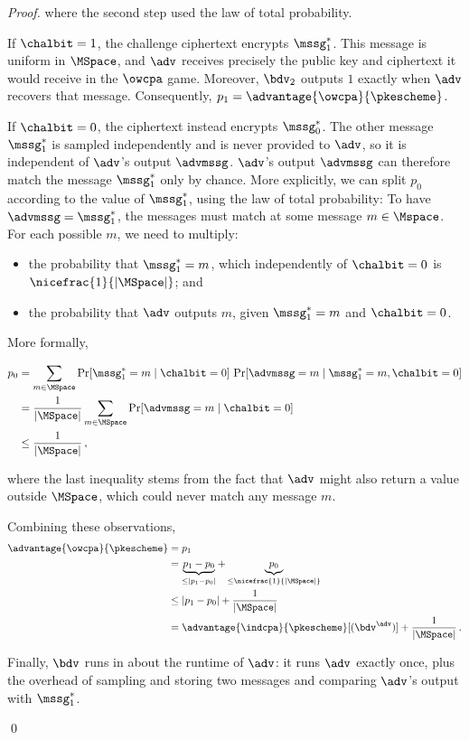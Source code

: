 \begin{proof}
    	where the second step used the law of total probability.
    	
    	If $\chalbit=1$, the challenge ciphertext encrypts $\mssg_1^*$.
    	This message is uniform in $\MSpace$, and $\adv$ receives precisely
    	the public key and ciphertext it would receive in the $\owcpa$ game.
    	Moreover, $\bdv_2$ outputs $1$ exactly when $\adv$ recovers that
    	message. Consequently, $p_1=\advantage{\owcpa}{\pkescheme}$.
    	
    	If $\chalbit=0$, the ciphertext instead encrypts $\mssg_0^*$.
    	The other message $\mssg_1^*$ is sampled independently and is never
    	provided to $\adv$, so it is independent of $\adv$'s output $\advmssg$.
    	$\adv$'s output $\advmssg$ can therefore match the message $\mssg_1^*$ only by chance.
    	More explicitly, we can split $p_0$ according to the value of $\mssg_1^*$,
    	using the law of total probability:
    	To have $\advmssg = \mssg_1^*$, the messages must match at some message $m \in \Mspace$.
    	For each possible $m$, we need to multiply:
    	\begin{itemize}
    		\item the probability that $\mssg_1^* = m$, which independently of $\chalbit = 0$ is $\nicefrac{1}{|\MSpace|}$; and
    		\item the probability that $\adv$ outputs $m$, given $\mssg_1^* = m$ and $\chalbit = 0$.
    	\end{itemize}
    	
    	More formally,
    	
    	\begin{align*}
    		p_0
    		&= \sum_{ m \in \MSpace }
	    		\Pr[ \mssg_1^* = m \mid \chalbit=0 ]\,
	    		\Pr[ \advmssg = m  \mid \mssg_1^*=m, \chalbit=0 ]\\
    		&= \frac{1}{|\MSpace|}
    			\sum_{ m \in \MSpace } \Pr[ \advmssg = m\mid \chalbit=0 ]\\
    		&\leq \frac{1}{|\MSpace|} \, ,
    	\end{align*}
    	
    	where the last inequality stems from the fact that
    	$\adv$ might also return a value outside $\MSpace$,
    	which could never match any message $m$.
    	
    	Combining these observations,
    	\[
    	\begin{aligned}
    		\advantage{\owcpa}{\pkescheme}
    		&= p_1
    		\\
    		&= \underbrace{p_1 - p_0}_{\leq |p_1 - p_0|}
    		 + \underbrace{p_0}_{\leq \nicefrac{1}{|\MSpace|}}
    		\\
    		&\leq |p_1-p_0| + \frac{1}{|\MSpace|} \\
    		&= \advantage{\indcpa}{\pkescheme}[(\bdv^\adv)]
    			+ \frac{1}{|\MSpace|} \, .
    	\end{aligned}
    	\]
    	
    	Finally, $\bdv$ runs in about the runtime of $\adv$:
    	it runs $\adv$ exactly once,
    	plus the overhead of sampling and storing two messages
    	and comparing $\adv$'s output with $\mssg_1^*$.
      
      \qed
    \end{proof}

